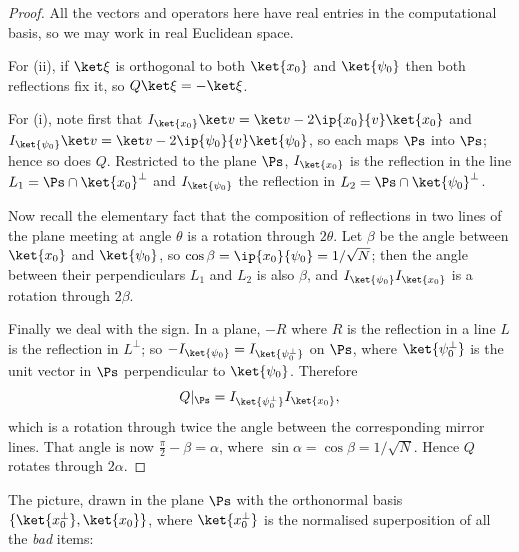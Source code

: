 \begin{proof}
	All the vectors and operators here have real entries in the computational basis, so we may work in real Euclidean space.

	For (ii), if $\ket\xi$ is orthogonal to both $\ket{x_0}$ and $\ket{\psi_0}$ then both reflections fix it, so $Q\ket\xi = -\ket\xi$.

	For (i), note first that $I_{\ket{x_0}}\ket v = \ket v - 2\ip{x_0}{v}\ket{x_0}$ and $I_{\ket{\psi_0}}\ket v = \ket v - 2\ip{\psi_0}{v}\ket{\psi_0}$, so each maps $\Ps$ into $\Ps$; hence so does $Q$. Restricted to the plane $\Ps$, $I_{\ket{x_0}}$ is the reflection in the line $L_1 = \Ps\cap\ket{x_0}^\perp$ and $I_{\ket{\psi_0}}$ the reflection in $L_2 = \Ps\cap\ket{\psi_0}^\perp$.

	Now recall the elementary fact that the composition of reflections in two lines of the plane meeting at angle $\theta$ is a rotation through $2\theta$. Let $\beta$ be the angle between $\ket{x_0}$ and $\ket{\psi_0}$, so $\cos\beta = \ip{x_0}{\psi_0} = 1/\sqrt N$; then the angle between their perpendiculars $L_1$ and $L_2$ is also $\beta$, and $I_{\ket{\psi_0}}I_{\ket{x_0}}$ is a rotation through $2\beta$.

	Finally we deal with the sign. In a plane, $-R$ where $R$ is the reflection in a line $L$ is the reflection in $L^\perp$; so $-I_{\ket{\psi_0}} = I_{\ket{\psi_0^\perp}}$ on $\Ps$, where $\ket{\psi_0^\perp}$ is the unit vector in $\Ps$ perpendicular to $\ket{\psi_0}$. Therefore
	$$Q|_\Ps = I_{\ket{\psi_0^\perp}}I_{\ket{x_0}},$$
	which is a rotation through twice the angle between the corresponding mirror lines. That angle is now $\tfrac\pi2-\beta = \alpha$, where $\sin\alpha = \cos\beta = 1/\sqrt N$. Hence $Q$ rotates through $2\alpha$.
\end{proof}

The picture, drawn in the plane $\Ps$ with the orthonormal basis $\{\ket{x_0^\perp},\ket{x_0}\}$, where $\ket{x_0^\perp}$ is the normalised superposition of all the \emph{bad} items:

